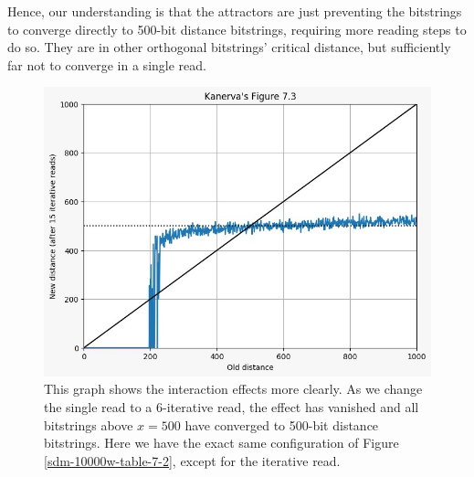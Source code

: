 Hence, our understanding is that the attractors are just preventing the bitstrings to converge directly to 500-bit distance bitstrings, requiring more reading steps to do so. They are in other orthogonal bitstrings' critical distance, but sufficiently far not to converge in a single read.

\begin{figure}[h]
\centering\includegraphics[width=\textwidth]{images02/sdm-10000w-table-7-2-15iter.png}
\caption{This graph shows the interaction effects more clearly.  As we change the single read to a 6-iterative read, the effect has vanished and all bitstrings above $x=500$ have converged to 500-bit distance bitstrings. Here we have the exact same configuration of Figure \ref{sdm-10000w-table-7-2}, except for the iterative read.
\label{sdm-10000w-table-7-2-15iter}}
\end{figure}


